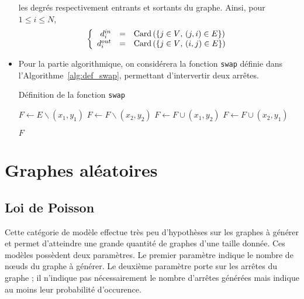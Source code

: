 \documentclass[a4paper]{article}
\newcommand{\tq}{\text{, }}
\newcommand{\card}[1]{\mathrm{Card}\left( #1 \right)}
\begin{document}
\begin{itemize}
        les degrés respectivement entrants et sortants du graphe. Ainsi,
        pour $1 \leq i \leq N$,
        \[
            \left\{
                \begin{array}{r c l}
                    d^{in}_i &=& \card{ \left\{ j \in V \tq (j, i) \in E \right\}} \\
                    d^{out}_i &=& \card{ \left\{ j \in V \tq (i, j) \in E \right\}} \\
                \end{array}
            \right.
        \]
    \item Pour la partie algorithmique, on considérera la fonction
        \texttt{swap} définie dans l'Algorithme~\ref{alg:def_swap}, permettant
        d'intervertir deux arrêtes.
    \begin{algorithm}
        \caption{Définition de la fonction \texttt{swap}}
        \label{alg:def_swap}
        \begin{algorithmic}[1]
                \State $F \gets E \backslash (x_1, y_1)$
                \State $F \gets F \backslash (x_2, y_2)$
                \State $F \gets F \cup (x_1, y_2)$
                \State $F \gets F \cup (x_2, y_1)$

                \Return $F$
            \EndFunction
        \end{algorithmic}
    \end{algorithm}
\end{itemize}

\section{Graphes aléatoires}
\label{sec:graphes_aleatoires}

    \subsection{Loi de Poisson}
    \label{sub:loi_de_poisson}
        Cette catégorie de modèle effectue très peu d'hypothèses sur les
        graphes à générer et permet d'atteindre une grande quantité de graphes
        d'une taille donnée. Ces modèles possèdent deux paramètres. Le premier
        paramètre indique le nombre de n\oe{}uds du graphe à générer. Le
        deuxième paramètre porte sur les arrêtes du graphe ; il n'indique pas
        nécessairement le nombre d'arrêtes générées mais indique au moins leur
        probabilité d'occurence.
\end{document}
